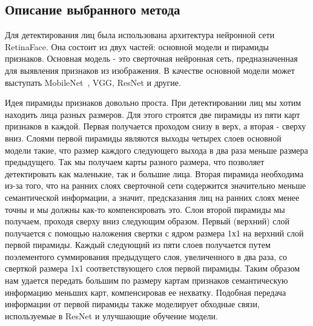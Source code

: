 \subsection{Описание выбранного метода}\label{subsec:описание-выбранного-метода}
Для детектирования лиц была использована архитектура нейронной сети RetinaFace\cite{retinaface}.
Она состоит из двух частей: основной модели и пирамиды признаков.
Основная модель - это сверточная нейронная сеть, предназначенная для выявления признаков из изображения.
В качестве основной модели может выступать MobileNet~\cite{mobile}, VGG, ResNet и другие.
\par Идея пирамиды признаков довольно проста.
При детектировании лиц мы хотим находить лица разных размеров.
Для этого строятся две пирамиды из пяти карт признаков в каждой.
Первая получается проходом снизу в верх, а вторая - сверху вниз.
Слоями первой пирамиды являются выходы четырех слоев основной модели такие,
что размер каждого следующего выхода в два раза меньше размера предыдущего.
Так мы получаем карты разного размера, что позволяет детектировать как маленькие, так и большие лица.
Вторая пирамида необходима из-за того, что на ранних слоях сверточной сети содержится значительно меньше семантической информации,
а значит, предсказания лиц на ранних слоях менее точны и мы должны как-то компенсировать это.
Слои второй пирамиды мы получаем, проходя сверху вниз следующим образом.
Первый (верхний) слой получается с помощью наложения свертки с ядром размера 1х1 на верхний слой первой пирамиды.
Каждый следующий из пяти слоев получается путем поэлементого суммирования предыдущего слоя,
увеличенного в два раза, со сверткой размера 1х1 соответствующего слоя первой пирамиды.
Таким образом нам удается передать большим по размеру картам признаков семантическую информацию меньших карт, компенсировав ее нехватку.
Подобная передача информации от первой пирамиды также моделирует обходные связи, используемые в ResNet и улучшающие обучение модели.

